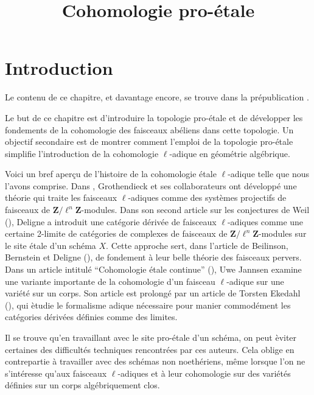 

%


\title{Cohomologie pro-\'etale}


\maketitle

\label{section-phantom}

\tableofcontents

\section{Introduction}
\label{section-introduction}

\noindent
Le contenu de ce chapitre, et davantage encore, se trouve dans la pr\'epublication \cite{BS}.

\medskip\noindent
Le but de ce chapitre est d'introduire la topologie pro-\'etale et de
d\'evelopper les fondements de la cohomologie des faisceaux ab\'eliens dans cette topologie.
Un objectif secondaire est de montrer comment l'emploi de la topologie pro-\'etale simplifie
l'introduction de la cohomologie $\ell$-adique en g\'eom\'etrie alg\'ebrique.

\medskip\noindent
Voici un bref aper\c{c}u de l'histoire de la cohomologie \'etale $\ell$-adique
telle que nous l'avons comprise.
Dans \cite[Expos\'es V et VI]{SGA5}, Grothendieck et ses collaborateurs ont d\'evelopp\'e une th\'eorie
qui traite les faisceaux $\ell$-adiques comme des syst\`emes projectifs de faisceaux de
$\mathbf{Z}/\ell^n\mathbf{Z}$-modules.
Dans son second article sur les conjectures de Weil (\cite{WeilII}), Deligne a introduit
une cat\'egorie d\'eriv\'ee de faisceaux $\ell$-adiques comme une certaine 2-limite de cat\'egories
de complexes de faisceaux de $\mathbf{Z}/\ell^n\mathbf{Z}$-modules sur le
site \'etale d'un sch\'ema $X$. Cette approche sert, dans l'article de
Beilinson, Bernstein et Deligne (\cite{BBD}), de fondement \`a leur
belle th\'eorie des faisceaux pervers. Dans un article intitul\'e ``Cohomologie
\'etale continue'' (\cite{Jannsen}), Uwe Jannsen examine une variante importante
de la cohomologie d'un faisceau $\ell$-adique sur une vari\'et\'e sur un corps.
Son article est prolong\'e par un article de Torsten Ekedahl (\cite{Ekedahl}),
qui \`etudie le formalisme adique n\'ecessaire pour manier commod\'ement les cat\'egories
d\'eriv\'ees d\'efinies comme des limites.

\medskip\noindent
Il se trouve qu'en travaillant avec le site pro-\'etale d'un sch\'ema,
on peut \`eviter certaines des difficult\'es techniques rencontr\'ees par ces auteurs.
Cela oblige en contrepartie \`a travailler avec des sch\'emas non noeth\'eriens,
m\^eme lorsque l'on ne s'int\'eresse qu'aux faisceaux $\ell$-adiques
et \`a leur cohomologie sur des vari\'et\'es d\'efinies sur un corps alg\'ebriquement clos.

